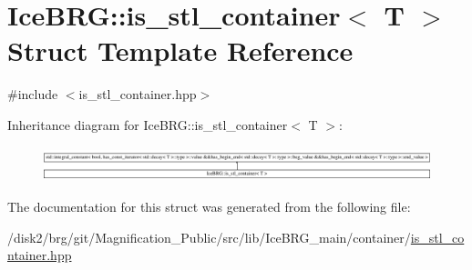 \hypertarget{structIceBRG_1_1is__stl__container}{}\section{Ice\+B\+R\+G\+:\+:is\+\_\+stl\+\_\+container$<$ T $>$ Struct Template Reference}
\label{structIceBRG_1_1is__stl__container}


{\ttfamily \#include $<$is\+\_\+stl\+\_\+container.\+hpp$>$}

Inheritance diagram for Ice\+B\+R\+G\+:\+:is\+\_\+stl\+\_\+container$<$ T $>$\+:\begin{figure}[H]
\begin{center}
\leavevmode
\includegraphics[height=1.009009cm]{structIceBRG_1_1is__stl__container}
\end{center}
\end{figure}


The documentation for this struct was generated from the following file\+:\begin{DoxyCompactItemize}
\item 
/disk2/brg/git/\+Magnification\+\_\+\+Public/src/lib/\+Ice\+B\+R\+G\+\_\+main/container/\hyperlink{is__stl__container_8hpp}{is\+\_\+stl\+\_\+container.\+hpp}\end{DoxyCompactItemize}
